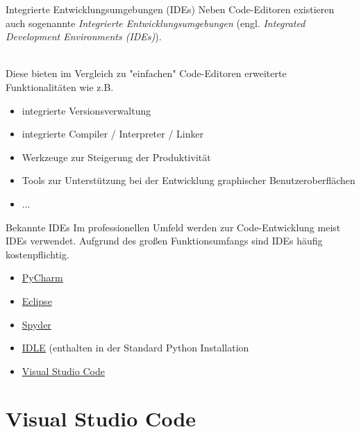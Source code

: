   \begin{frame}{Integrierte Entwicklungsumgebungen (IDEs)}
      Neben Code-Editoren existieren auch sogenannte \textit{Integrierte Entwicklungsumgebungen} (engl. \textit{Integrated Development Environments (IDEs)}). \\~\
      
      Diese bieten im Vergleich zu "einfachen" Code-Editoren erweiterte Funktionalitäten wie z.B.
      
      \begin{itemize}
          \item integrierte Versionsverwaltung
          \item integrierte Compiler / Interpreter / Linker
          \item Werkzeuge zur Steigerung der Produktivität
          \item Tools zur Unterstützung bei der Entwicklung graphischer Benutzeroberflächen
          \item ...
      \end{itemize}
        
  \end{frame}
  
   \begin{frame}{Bekannte IDEs}
      Im professionellen Umfeld werden zur Code-Entwicklung meist IDEs verwendet. Aufgrund des großen Funktionsumfangs sind IDEs häufig kostenpflichtig.
      
      \begin{itemize}
          \item \href{https://www.jetbrains.com/de-de/pycharm/}{PyCharm}
          \item \href{https://www.eclipse.org/}{Eclipse}
          \item \href{https://www.spyder-ide.org/}{Spyder}
          \item \href{https://docs.python.org/3/library/idle.html}{IDLE} (enthalten in der Standard Python Installation
          \item \href{https://code.visualstudio.com/}{Visual Studio Code}
      \end{itemize}
        
  \end{frame}
  
\section{Visual Studio Code}

